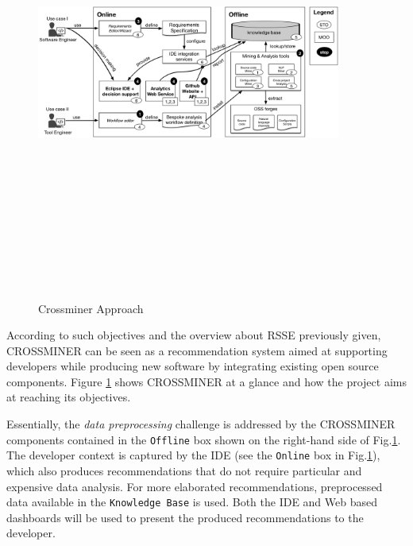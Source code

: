 \begin{figure}[H]
\includegraphics[width=10cm,height=15cm,keepaspectratio]{images/crossminer.png}
\centering
\caption{Crossminer Approach}
\label{fig:CrossminerApproach}
\end{figure}

According to such objectives and the overview about RSSE previously given, CROSSMINER can be seen as a recommendation system aimed at supporting developers while producing new software by integrating existing open source components. Figure \ref{fig:CrossminerApproach} shows CROSSMINER at a glance and how the project aims at reaching its objectives.

Essentially, the \textit{data preprocessing} challenge is addressed by the CROSSMINER components contained in the \texttt{Offline} box shown on the right-hand side of Fig.\ref{fig:CrossminerApproach}. The developer context is captured by the IDE (see the \texttt{Online} box in Fig.\ref{fig:CrossminerApproach}), which also produces recommendations that do not require particular and expensive data analysis. For more elaborated recommendations, preprocessed data available in the \texttt{Knowledge Base} is used. Both the IDE and Web based dashboards will be used to present the produced recommendations to the developer. 

